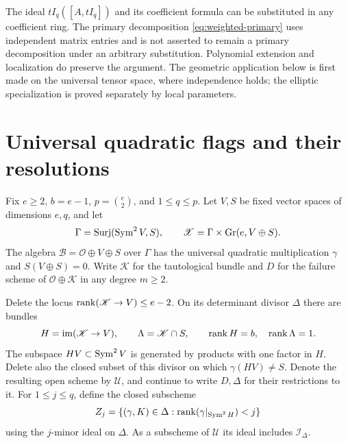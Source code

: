 \begin{remark}
\label{rem:weighted-specialization}
The ideal $tI_q([A,tI_q])$ and its coefficient formula can be
substituted in any coefficient ring. The primary decomposition
\eqref{eq:weighted-primary} uses independent matrix entries and is
not asserted to remain a primary decomposition under an arbitrary
substitution. Polynomial extension and localization do preserve the
argument. The geometric application below is first made on the
universal tensor space, where independence holds; the elliptic
specialization is proved separately by local parameters.
\end{remark}

\section{Universal quadratic flags and their resolutions}
\label{sec:universal-flags}
Fix $e\ge2$, $b=e-1$, $p=\binom e2$, and $1\le q\le p$.
Let $V,S$ be fixed vector spaces of dimensions $e,q$, and let
\[
 \Gamma=\operatorname{Surj}(\operatorname{Sym}^2V,S),\qquad
 \mathscr X=\Gamma\times\operatorname{Gr}(e,V\oplus S).
\]
The algebra $\mathscr B=\mathcal O\oplus V\oplus S$ over $\Gamma$
has the universal quadratic multiplication $\gamma$ and
$S(V\oplus S)=0$. Write $\mathscr K$ for the tautological bundle
and $D$ for the failure scheme of $\mathcal O\oplus\mathscr K$
in any degree $m\ge2$.

Delete the locus $\operatorname{rank}(\mathscr K\to V)\le e-2$.
On its determinant divisor $\Delta$ there are bundles
\[
 H=\operatorname{im}(\mathscr K\to V),\qquad
 \Lambda=\mathscr K\cap S,
 \qquad \operatorname{rank} H=b,\quad\operatorname{rank}\Lambda=1.
\]
The subspace $HV\subset\operatorname{Sym}^2V$ is generated by products with one
factor in $H$. Delete also the closed subset of this divisor on which
$\gamma(HV)\ne S$. Denote the resulting open scheme by $\mathscr U$,
and continue to write $D,\Delta$ for their restrictions to it.
For $1\le j\le q$, define the closed subscheme
\begin{equation}\label{eq:universal-Zj}
 Z_j=\{(\gamma,K)\in\Delta:
             \operatorname{rank}(\gamma|_{\operatorname{Sym}^2H})<j\}
\end{equation}
using the $j$-minor ideal on $\Delta$. As a subscheme of $\mathscr U$
its ideal includes $\mathcal I_\Delta$.

